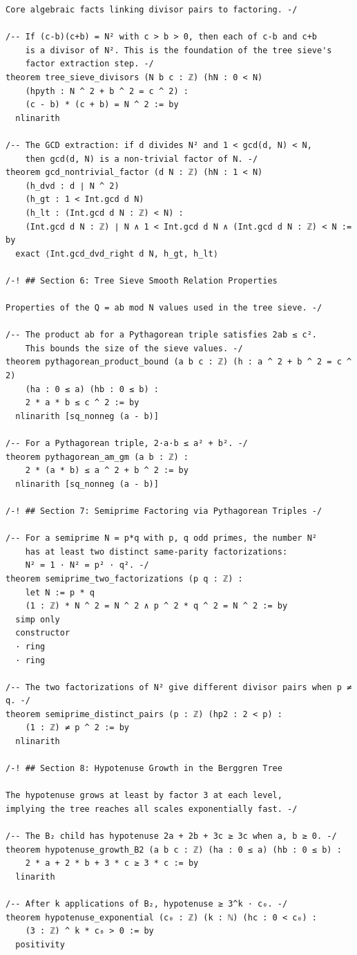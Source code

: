 \documentclass[11pt,openany]{book}
\theoremstyle{definition}
\theoremstyle{plain}
\theoremstyle{remark}
\begin{document}
\begin{lstlisting}[style=lean]
Core algebraic facts linking divisor pairs to factoring. -/

/-- If (c-b)(c+b) = N² with c > b > 0, then each of c-b and c+b
    is a divisor of N². This is the foundation of the tree sieve's
    factor extraction step. -/
theorem tree_sieve_divisors (N b c : ℤ) (hN : 0 < N)
    (hpyth : N ^ 2 + b ^ 2 = c ^ 2) :
    (c - b) * (c + b) = N ^ 2 := by
  nlinarith

/-- The GCD extraction: if d divides N² and 1 < gcd(d, N) < N,
    then gcd(d, N) is a non-trivial factor of N. -/
theorem gcd_nontrivial_factor (d N : ℤ) (hN : 1 < N)
    (h_dvd : d ∣ N ^ 2)
    (h_gt : 1 < Int.gcd d N)
    (h_lt : (Int.gcd d N : ℤ) < N) :
    (Int.gcd d N : ℤ) ∣ N ∧ 1 < Int.gcd d N ∧ (Int.gcd d N : ℤ) < N := by
  exact ⟨Int.gcd_dvd_right d N, h_gt, h_lt⟩

/-! ## Section 6: Tree Sieve Smooth Relation Properties

Properties of the Q = ab mod N values used in the tree sieve. -/

/-- The product ab for a Pythagorean triple satisfies 2ab ≤ c².
    This bounds the size of the sieve values. -/
theorem pythagorean_product_bound (a b c : ℤ) (h : a ^ 2 + b ^ 2 = c ^ 2)
    (ha : 0 ≤ a) (hb : 0 ≤ b) :
    2 * a * b ≤ c ^ 2 := by
  nlinarith [sq_nonneg (a - b)]

/-- For a Pythagorean triple, 2·a·b ≤ a² + b². -/
theorem pythagorean_am_gm (a b : ℤ) :
    2 * (a * b) ≤ a ^ 2 + b ^ 2 := by
  nlinarith [sq_nonneg (a - b)]

/-! ## Section 7: Semiprime Factoring via Pythagorean Triples -/

/-- For a semiprime N = p*q with p, q odd primes, the number N²
    has at least two distinct same-parity factorizations:
    N² = 1 · N² = p² · q². -/
theorem semiprime_two_factorizations (p q : ℤ) :
    let N := p * q
    (1 : ℤ) * N ^ 2 = N ^ 2 ∧ p ^ 2 * q ^ 2 = N ^ 2 := by
  simp only
  constructor
  · ring
  · ring

/-- The two factorizations of N² give different divisor pairs when p ≠ q. -/
theorem semiprime_distinct_pairs (p : ℤ) (hp2 : 2 < p) :
    (1 : ℤ) ≠ p ^ 2 := by
  nlinarith

/-! ## Section 8: Hypotenuse Growth in the Berggren Tree

The hypotenuse grows at least by factor 3 at each level,
implying the tree reaches all scales exponentially fast. -/

/-- The B₂ child has hypotenuse 2a + 2b + 3c ≥ 3c when a, b ≥ 0. -/
theorem hypotenuse_growth_B2 (a b c : ℤ) (ha : 0 ≤ a) (hb : 0 ≤ b) :
    2 * a + 2 * b + 3 * c ≥ 3 * c := by
  linarith

/-- After k applications of B₂, hypotenuse ≥ 3^k · c₀. -/
theorem hypotenuse_exponential (c₀ : ℤ) (k : ℕ) (hc : 0 < c₀) :
    (3 : ℤ) ^ k * c₀ > 0 := by
  positivity

\end{lstlisting}
\end{document}
